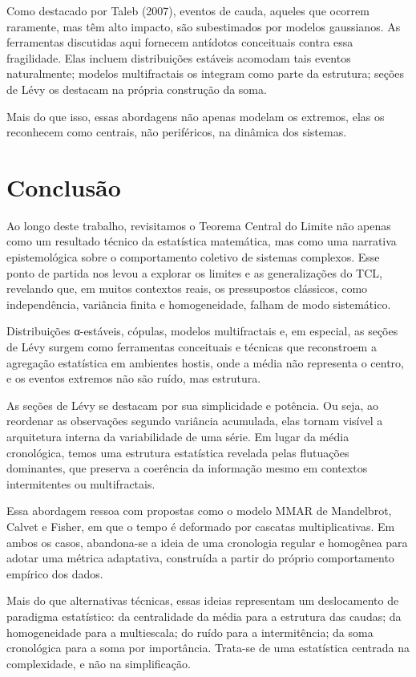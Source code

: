 \documentclass[
  letterpaper,
  DIV=11,
  numbers=noendperiod]{scrartcl}
\begin{document}
Como destacado por Taleb (2007), eventos de cauda, aqueles que ocorrem
raramente, mas têm alto impacto, são subestimados por modelos
gaussianos. As ferramentas discutidas aqui fornecem antídotos
conceituais contra essa fragilidade. Elas incluem distribuições estáveis
acomodam tais eventos naturalmente; modelos multifractais os integram
como parte da estrutura; seções de Lévy os destacam na própria
construção da soma.

Mais do que isso, essas abordagens não apenas modelam os extremos, elas
os reconhecem como centrais, não periféricos, na dinâmica dos sistemas.

\section{Conclusão}\label{conclusuxe3o}

Ao longo deste trabalho, revisitamos o Teorema Central do Limite não
apenas como um resultado técnico da estatística matemática, mas como uma
narrativa epistemológica sobre o comportamento coletivo de sistemas
complexos. Esse ponto de partida nos levou a explorar os limites e as
generalizações do TCL, revelando que, em muitos contextos reais, os
pressupostos clássicos, como independência, variância finita e
homogeneidade, falham de modo sistemático.

Distribuições α-estáveis, cópulas, modelos multifractais e, em especial,
as seções de Lévy surgem como ferramentas conceituais e técnicas que
reconstroem a agregação estatística em ambientes hostis, onde a média
não representa o centro, e os eventos extremos não são ruído, mas
estrutura.

As seções de Lévy se destacam por sua simplicidade e potência. Ou seja,
ao reordenar as observações segundo variância acumulada, elas tornam
visível a arquitetura interna da variabilidade de uma série. Em lugar da
média cronológica, temos uma estrutura estatística revelada pelas
flutuações dominantes, que preserva a coerência da informação mesmo em
contextos intermitentes ou multifractais.

Essa abordagem ressoa com propostas como o modelo MMAR de Mandelbrot,
Calvet e Fisher, em que o tempo é deformado por cascatas
multiplicativas. Em ambos os casos, abandona-se a ideia de uma
cronologia regular e homogênea para adotar uma métrica adaptativa,
construída a partir do próprio comportamento empírico dos dados.

Mais do que alternativas técnicas, essas ideias representam um
deslocamento de paradigma estatístico: da centralidade da média para a
estrutura das caudas; da homogeneidade para a multiescala; do ruído para
a intermitência; da soma cronológica para a soma por importância.
Trata-se de uma estatística centrada na complexidade, e não na
simplificação.
\end{document}
